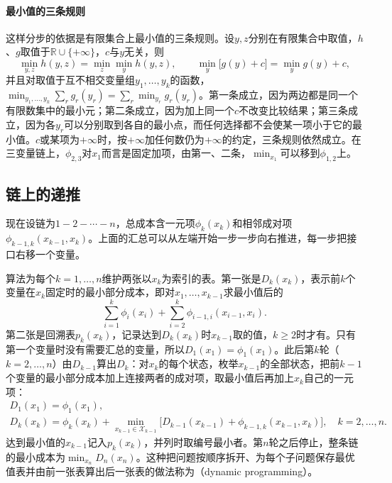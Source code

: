 \paragraph{最小值的三条规则}
这样分步的依据是有限集合上最小值的三条规则。设$y,z$分别在有限集合中取值，$h$、$g$取值于$\mathbb R\cup\{+\infty\}$，$c$与$y$无关，则
\begin{equation}
\min_{y,z}h(y,z)=\min_{z}\min_{y}h(y,z),\qquad
\min_{y}\bigl[g(y)+c\bigr]=\min_{y}g(y)+c,
\label{eq:graph-dp-min-rules}
\end{equation}
并且对取值于互不相交变量组$y_1,\ldots,y_k$的函数，$\min_{y_1,\ldots,y_k}\sum_{r}g_r(y_r)=\sum_r\min_{y_r}g_r(y_r)$。第一条成立，因为两边都是同一个有限数集中的最小元；第二条成立，因为加上同一个$c$不改变比较结果；第三条成立，因为各$y_r$可以分别取到各自的最小点，而任何选择都不会使某一项小于它的最小值。$c$或某项为$+\infty$时，按$+\infty$加任何数仍为$+\infty$的约定，三条规则依然成立。在三变量链上，$\phi_{2,3}$对$x_1$而言是固定加项，由第一、二条，$\min_{x_1}$可以移到$\phi_{1,2}$上。

\subsection{链上的递推}
\label{sec:graph-dp-chain}

现在设链为$1-2-\cdots-n$，总成本含一元项$\phi_k(x_k)$和相邻成对项$\phi_{k-1,k}(x_{k-1},x_k)$。上面的汇总可以从左端开始一步一步向右推进，每一步把接口右移一个变量。

算法为每个$k=1,\ldots,n$维护两张以$x_k$为索引的表。第一张是$D_k(x_k)$，表示前$k$个变量在$x_k$固定时的最小部分成本，即对$x_1,\ldots,x_{k-1}$求最小值后的
\[
\sum_{i=1}^{k}\phi_i(x_i)+\sum_{i=2}^{k}\phi_{i-1,i}(x_{i-1},x_i).
\]
第二张是回溯表$p_k(x_k)$，记录达到$D_k(x_k)$时$x_{k-1}$取的值，$k\geq2$时才有。只有第一个变量时没有需要汇总的变量，所以$D_1(x_1)=\phi_1(x_1)$。此后第$k$轮（$k=2,\ldots,n$）由$D_{k-1}$算出$D_k$：对$x_k$的每个状态，枚举$x_{k-1}$的全部状态，把前$k-1$个变量的最小部分成本加上连接两者的成对项，取最小值后再加上$x_k$自己的一元项：
\begin{equation}
\begin{gathered}
D_1(x_1)=\phi_1(x_1),\\
D_k(x_k)=\phi_k(x_k)+\min_{x_{k-1}\in\mathcal X_{k-1}}\bigl[D_{k-1}(x_{k-1})+\phi_{k-1,k}(x_{k-1},x_k)\bigr],\quad k=2,\ldots,n.
\end{gathered}
\label{eq:graph-dp-chain-recursion}
\end{equation}
达到最小值的$x_{k-1}$记入$p_k(x_k)$，并列时取编号最小者。第$n$轮之后停止，整条链的最小成本为$\min_{x_n}D_n(x_n)$。这种把问题按顺序拆开、为每个子问题保存最优值表并由前一张表算出后一张表的做法称为（dynamic programming）。

